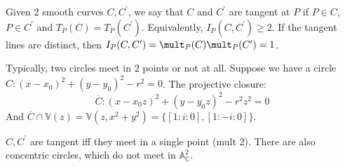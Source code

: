 \documentclass{report}
\begin{document}
\begin{definition}{}
    Given $2$ smooth curves $C, C^{\prime}$, we say that $C$ and $C^{\prime}$ are tangent at $P$ if $P \in C$, $P \in C^{\prime}$ and $T_{P}(C) = T_{P}(C^{\prime})$. Equivalently, $I_{P}(C, C^{\prime}) \geq 2$. If the tangent lines are distinct, then $I_{P}(C, C^{\prime}) = \mult_{ P}(C)\mult_{ P}(C^{\prime}) = 1$.
\end{definition}

Typically, two circles meet in $2$ points or not at all. Suppose we have a circle $C : (x - x_{0})^{2} + (y - y_{0})^{2} - r^{2} = 0$. The projective closure:
    \begin{equation*}
        \overline{C}: (x - x_{0}z)^{2} + (y - y_{0}z)^{2} - r^{2}z^{2} = 0
    \end{equation*}
And $\overline{C} \cap \mathbb{ V}(z) = \mathbb{V}(z, x^{2} + y^{2}) = \{[1 : i : 0], [1 : -i : 0]\}$. 

$C, C^{\prime}$ are tangent iff they meet in a single point (mult 2). There are also concentric circles, which do not meet in $\mathbb{A}^{2}_{\mathbb{C}}$. 
\end{document}
